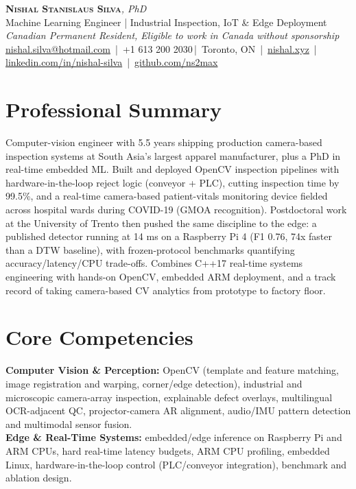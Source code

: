 \documentclass[11pt]{article}
\makeatletter
\newcommand{\cvName}{Nishal Stanislaus Silva}
\newcommand{\cvEmail}{nishal.silva@hotmail.com}
\newcommand{\cvPhone}{+1 613 200 2030}
\newcommand{\cvCity}{Toronto, ON}
\newcommand{\cvSite}{https://nishal.xyz}
\newcommand{\cvLinkedIn}{https://www.linkedin.com/in/nishal-silva}
\newcommand{\cvGitHub}{https://github.com/ns2max}
\newcommand{\cvStatus}{Canadian Permanent Resident, Eligible to work in Canada without sponsorship}
\newcommand{\cvTagline}{Machine Learning Engineer | Industrial Inspection, IoT \& Edge Deployment}
\makeatother
\begin{document}
\pagestyle{empty}
\begin{center}
    {\LARGE \scshape \textbf{\cvName}}{\large \textit{, PhD}}\\[1pt]
    {\small \cvTagline}\\[1pt]
    {\footnotesize\textit{\cvStatus}}\\[1pt]
    {\small
    \href{mailto:\cvEmail}{\cvEmail} \,|\, \cvPhone \,|\, \cvCity
    \,|\, \href{\cvSite}{nishal.xyz} \,|\, \href{\cvLinkedIn}{linkedin.com/in/nishal-silva}
    \,|\, \href{\cvGitHub}{github.com/ns2max}}
\end{center}

\section*{Professional Summary}
Computer-vision engineer with 5.5 years shipping production camera-based inspection systems at South Asia's largest apparel manufacturer, plus a PhD in real-time embedded ML. Built and deployed OpenCV inspection pipelines with hardware-in-the-loop reject logic (conveyor + PLC), cutting inspection time by 99.5\%, and a real-time camera-based patient-vitals monitoring device fielded across hospital wards during COVID-19 (GMOA recognition). Postdoctoral work at the University of Trento then pushed the same discipline to the edge: a published detector running at 14 ms on a Raspberry Pi 4 (F1 0.76, 74x faster than a DTW baseline), with frozen-protocol benchmarks quantifying accuracy/latency/CPU trade-offs. Combines C++17 real-time systems engineering with hands-on OpenCV, embedded ARM deployment, and a track record of taking camera-based CV analytics from prototype to factory floor.

\section*{Core Competencies}
\textbf{Computer Vision \& Perception:} OpenCV (template and feature matching, image registration and warping, corner/edge detection), industrial and microscopic camera-array inspection, explainable defect overlays, multilingual OCR-adjacent QC, projector-camera AR alignment, audio/IMU pattern detection and multimodal sensor fusion. \\
\textbf{Edge \& Real-Time Systems:} embedded/edge inference on Raspberry Pi and ARM CPUs, hard real-time latency budgets, ARM CPU profiling, embedded Linux, hardware-in-the-loop control (PLC/conveyor integration), benchmark and ablation design.
\end{document}
